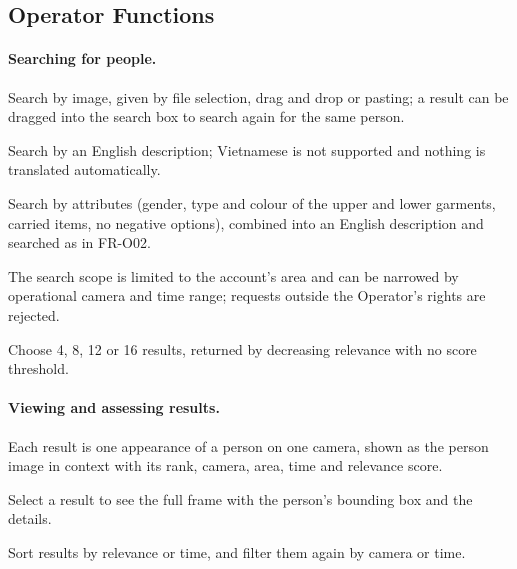 \subsection{Operator Functions}
\label{sec:4.2.3}

\paragraph{Searching for people.}
\begin{reqlist}
    \item[FR-O01] Search by image, given by file selection, drag and drop or pasting; a result can be dragged into the search box to search again for the same person.
    \item[FR-O02] Search by an English description; Vietnamese is not supported and nothing is translated automatically.
    \item[FR-O03] Search by attributes (gender, type and colour of the upper and lower garments, carried items, no negative options), combined into an English description and searched as in FR-O02.
    \item[FR-O04] The search scope is limited to the account's area and can be narrowed by operational camera and time range; requests outside the Operator's rights are rejected.
    \item[FR-O05] Choose 4, 8, 12 or 16 results, returned by decreasing relevance with no score threshold.
\end{reqlist}

\paragraph{Viewing and assessing results.}
\begin{reqlist}
    \item[FR-O06] Each result is one appearance of a person on one camera, shown as the person image in context with its rank, camera, area, time and relevance score.
    \item[FR-O07] Select a result to see the full frame with the person's bounding box and the details.
    \item[FR-O08] Sort results by relevance or time, and filter them again by camera or time.
\end{reqlist}

